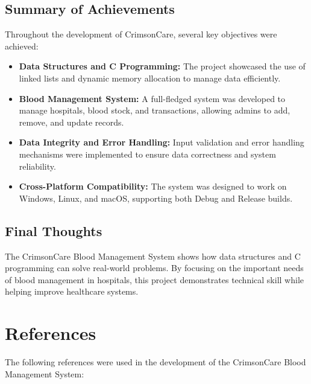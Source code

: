 \documentclass[12pt,a4paper]{report}
\begin{document}
\section{Summary of Achievements}
Throughout the development of CrimsonCare, several key objectives were achieved:
\begin{itemize}
    \item \textbf{Data Structures and C Programming:} The project showcased the use of linked lists and dynamic memory allocation to manage data efficiently.
    \item \textbf{Blood Management System:} A full-fledged system was developed to manage hospitals, blood stock, and transactions, allowing admins to add, remove, and update records.
    \item \textbf{Data Integrity and Error Handling:} Input validation and error handling mechanisms were implemented to ensure data correctness and system reliability.
    \item \textbf{Cross-Platform Compatibility:} The system was designed to work on Windows, Linux, and macOS, supporting both Debug and Release builds.
\end{itemize}

\section{Final Thoughts}
The CrimsonCare Blood Management System shows how data structures and C programming can solve real-world problems.
By focusing on the important needs of blood management in hospitals, this project demonstrates technical skill while helping improve healthcare systems.

\chapter{References}

The following references were used in the development of the CrimsonCare Blood Management System:
\end{document}
